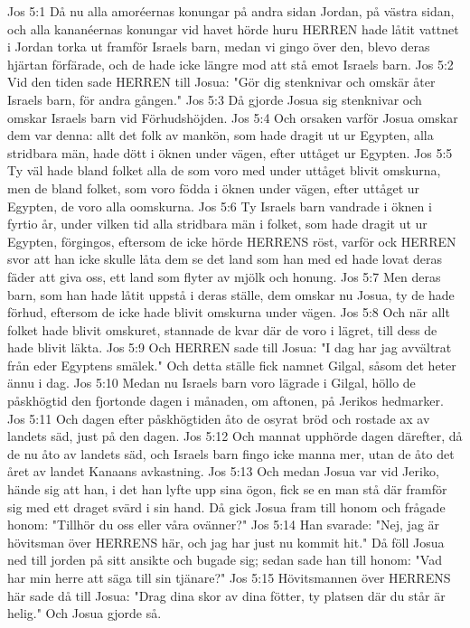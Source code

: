 Jos 5:1  Då nu alla amoréernas konungar på andra sidan Jordan, på västra sidan, och alla kananéernas konungar vid havet hörde huru HERREN hade låtit vattnet i Jordan torka ut framför Israels barn, medan vi gingo över den, blevo deras hjärtan förfärade, och de hade icke längre mod att stå emot Israels barn.
Jos 5:2  Vid den tiden sade HERREN till Josua: "Gör dig stenknivar och omskär åter Israels barn, för andra gången."
Jos 5:3  Då gjorde Josua sig stenknivar och omskar Israels barn vid Förhudshöjden.
Jos 5:4  Och orsaken varför Josua omskar dem var denna: allt det folk av mankön, som hade dragit ut ur Egypten, alla stridbara män, hade dött i öknen under vägen, efter uttåget ur Egypten.
Jos 5:5  Ty väl hade bland folket alla de som voro med under uttåget blivit omskurna, men de bland folket, som voro födda i öknen under vägen, efter uttåget ur Egypten, de voro alla oomskurna.
Jos 5:6  Ty Israels barn vandrade i öknen i fyrtio år, under vilken tid alla stridbara män i folket, som hade dragit ut ur Egypten, förgingos, eftersom de icke hörde HERRENS röst, varför ock HERREN svor att han icke skulle låta dem se det land som han med ed hade lovat deras fäder att giva oss, ett land som flyter av mjölk och honung.
Jos 5:7  Men deras barn, som han hade låtit uppstå i deras ställe, dem omskar nu Josua, ty de hade förhud, eftersom de icke hade blivit omskurna under vägen.
Jos 5:8  Och när allt folket hade blivit omskuret, stannade de kvar där de voro i lägret, till dess de hade blivit läkta.
Jos 5:9  Och HERREN sade till Josua: "I dag har jag avvältrat från eder Egyptens smälek." Och detta ställe fick namnet Gilgal, såsom det heter ännu i dag.
Jos 5:10  Medan nu Israels barn voro lägrade i Gilgal, höllo de påskhögtid den fjortonde dagen i månaden, om aftonen, på Jerikos hedmarker.
Jos 5:11  Och dagen efter påskhögtiden åto de osyrat bröd och rostade ax av landets säd, just på den dagen.
Jos 5:12  Och mannat upphörde dagen därefter, då de nu åto av landets säd, och Israels barn fingo icke manna mer, utan de åto det året av landet Kanaans avkastning.
Jos 5:13  Och medan Josua var vid Jeriko, hände sig att han, i det han lyfte upp sina ögon, fick se en man stå där framför sig med ett draget svärd i sin hand. Då gick Josua fram till honom och frågade honom: "Tillhör du oss eller våra ovänner?"
Jos 5:14  Han svarade: "Nej, jag är hövitsman över HERRENS här, och jag har just nu kommit hit." Då föll Josua ned till jorden på sitt ansikte och bugade sig; sedan sade han till honom: "Vad har min herre att säga till sin tjänare?"
Jos 5:15  Hövitsmannen över HERRENS här sade då till Josua: "Drag dina skor av dina fötter, ty platsen där du står är helig." Och Josua gjorde så.
